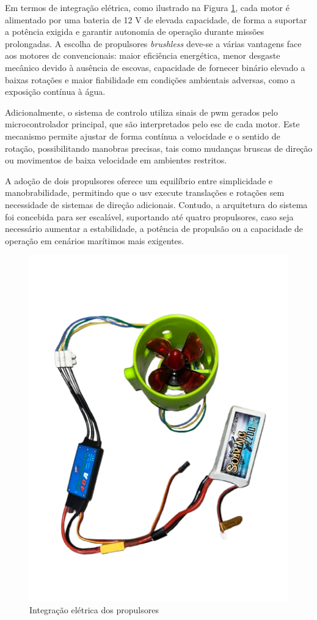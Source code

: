 Em termos de integração elétrica, como ilustrado na Figura \ref{fig:bat-thruster}, cada motor é alimentado por uma bateria de 12 V de elevada capacidade, de forma a suportar a potência exigida e garantir autonomia de operação durante missões prolongadas. A escolha de propulsores \emph{brushless} deve-se a várias vantagens face aos motores \gls{dc} convencionais: maior eficiência energética, menor desgaste mecânico devido à ausência de escovas, capacidade de fornecer binário elevado a baixas rotações e maior fiabilidade em condições ambientais adversas, como a exposição contínua à água.

Adicionalmente, o sistema de controlo utiliza sinais de \gls{pwm} gerados pelo microcontrolador principal, que são interpretados pelo \gls{esc} de cada motor. Este mecanismo permite ajustar de forma contínua a velocidade e o sentido de rotação, possibilitando manobras precisas, tais como mudanças bruscas de direção ou movimentos de baixa velocidade em ambientes restritos.

A adoção de dois propulsores oferece um equilíbrio entre simplicidade e manobrabilidade, permitindo que o \gls{usv} execute translações e rotações sem necessidade de sistemas de direção adicionais. Contudo, a arquitetura do sistema foi concebida para ser escalável, suportando até quatro propulsores, caso seja necessário aumentar a estabilidade, a potência de propulsão ou a capacidade de operação em cenários marítimos mais exigentes.

\begin{figure}[H]
    \centering
    \includegraphics[width=0.5\linewidth, angle=-90]{figuras/IMG_4420-removebg-preview.png}
    \caption{Integração elétrica dos propulsores}
    \label{fig:bat-thruster}
\end{figure}

